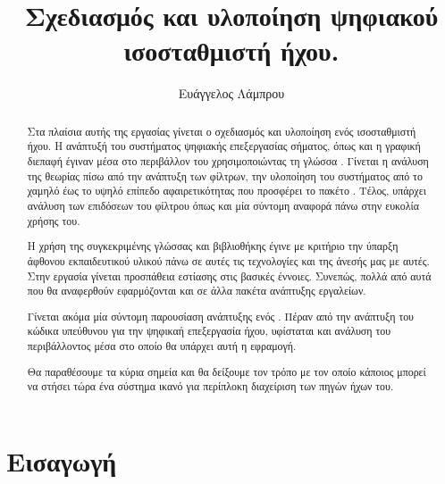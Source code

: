 \documentclass[12pt]{extarticle}
\begin{document}
\begin{titlepage}

\title{Σχεδιασμός και υλοποίηση ψηφιακού ισοσταθμιστή ήχου.}

\author{Ευάγγελος Λάμπρου}
\date{}

\maketitle


\begin{abstract}
    Στα πλαίσια αυτής της εργασίας γίνεται ο σχεδιασμός και υλοποίηση 
    ενός ισοσταθμιστή ήχου. 
    Η ανάπτυξή του συστήματος ψηφιακής επεξεργασίας σήματος, όπως 
    και η γραφική διεπαφή έγιναν μέσα στο περιβάλλον του 
     χρησιμοποιώντας τη γλώσσα . 
    Γίνεται η ανάλυση της θεωρίας πίσω από την ανάπτυξη των φίλτρων, 
    την υλοποίηση του συστήματος από το χαμηλό έως το υψηλό επίπεδο αφαιρετικότητας που 
    προσφέρει το πακέτο . 
    Τέλος, υπάρχει ανάλυση των επιδόσεων του φίλτρου όπως και μία σύντομη αναφορά πάνω 
    στην ευκολία χρήσης του.
    
    Η χρήση της συγκεκριμένης γλώσσας και βιβλιοθήκης έγινε με κριτήριο την ύπαρξη άφθονου
    εκπαιδευτικού υλικού πάνω σε αυτές τις τεχνολογίες και της άνεσής μας με αυτές. 
    Στην εργασία γίνεται προσπάθεια εστίασης στις βασικές έννοιες. Συνεπώς, πολλά από
    αυτά που θα αναφερθούν εφαρμόζονται και σε άλλα πακέτα ανάπτυξης  εργαλείων.

    Γίνεται ακόμα μία σύντομη παρουσίαση ανάπτυξης ενός . Πέραν από
    την ανάπτυξη του κώδικα υπεύθυνου για την ψηφικαή επεξεργασία ήχου, υφίσταται
    και ανάλυση του περιβάλλοντος μέσα στο οποίο θα υπάρχει αυτή η εφραμογή.

    Θα παραθέσουμε τα κύρια σημεία και θα δείξουμε τον τρόπο με τον οποίο
    κάποιος μπορεί να στήσει τώρα ένα σύστημα ικανό για περίπλοκη διαχείριση
    των πηγών ήχων του. 
\end{abstract}

\tableofcontents

\end{titlepage}


\section{Εισαγωγή}
\end{document}
